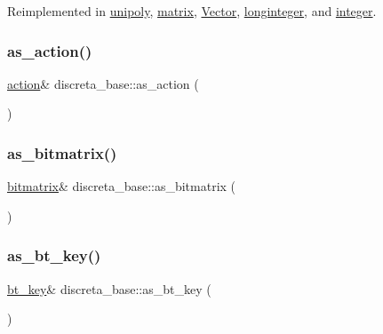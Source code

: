 Reimplemented in \mbox{\hyperlink{classunipoly_abebdaf912a2b0e7c27470f4191d0e180}{unipoly}}, \mbox{\hyperlink{classmatrix_a4ade010e5f49a23fab4cb5211b106e81}{matrix}}, \mbox{\hyperlink{class_vector_a3e170560de50e3a4f4a95f6b90bf75bb}{Vector}}, \mbox{\hyperlink{classlonginteger_a457c74224b83d9fbfc904a391baab7ed}{longinteger}}, and \mbox{\hyperlink{classinteger_a3f6fe19fe4f2948364b1e75a6dfec47f}{integer}}.

\mbox{\label{classdiscreta__base_aee03453d453c64f57eb30bf482d3ba8a}} 
\subsubsection{\texorpdfstring{as\+\_\+action()}{as\_action()}}
{\footnotesize\ttfamily \mbox{\hyperlink{classaction}{action}}\& discreta\+\_\+base\+::as\+\_\+action (\begin{DoxyParamCaption}{ }\end{DoxyParamCaption})\hspace{0.3cm}{\ttfamily [inline]}}

\mbox{\label{classdiscreta__base_a071ad54ea8ef6c9d1d15f532e5a76df6}} 
\subsubsection{\texorpdfstring{as\+\_\+bitmatrix()}{as\_bitmatrix()}}
{\footnotesize\ttfamily \mbox{\hyperlink{classbitmatrix}{bitmatrix}}\& discreta\+\_\+base\+::as\+\_\+bitmatrix (\begin{DoxyParamCaption}{ }\end{DoxyParamCaption})\hspace{0.3cm}{\ttfamily [inline]}}

\mbox{\label{classdiscreta__base_a2734c6e08dca17cf6588bd5064ec1b9f}} 
\subsubsection{\texorpdfstring{as\+\_\+bt\+\_\+key()}{as\_bt\_key()}}
{\footnotesize\ttfamily \mbox{\hyperlink{classbt__key}{bt\+\_\+key}}\& discreta\+\_\+base\+::as\+\_\+bt\+\_\+key (\begin{DoxyParamCaption}{ }\end{DoxyParamCaption})\hspace{0.3cm}{\ttfamily [inline]}}

